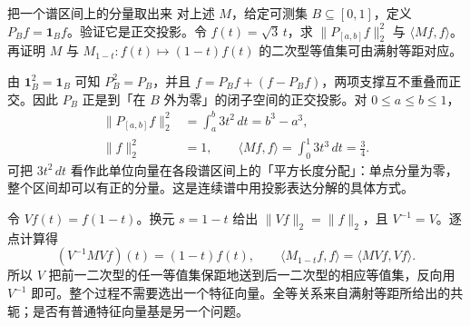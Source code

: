 \begin{example}{把一个谱区间上的分量取出来}
对上述 \(M\)，给定可测集 \(B\subseteq[0,1]\)，定义 \(P_B f=\mathbf1_B f\)。验证它是正交投影。令 \(f(t)=\sqrt3\,t\)，求 \(\|P_{[a,b]}f\|_2^2\) 与 \(\langle Mf,f\rangle\)。再证明 \(M\) 与 \(M_{1-t}:f(t)\mapsto(1-t)f(t)\) 的二次型等值集可由满射等距对应。
\end{example}
\begin{solution}
由 \(\mathbf1_B^2=\mathbf1_B\) 可知 \(P_B^2=P_B\)，并且 \(f=P_Bf+(f-P_Bf)\)，两项支撑互不重叠而正交。因此 \(P_B\) 正是到「在 \(B\) 外为零」的闭子空间的正交投影。对 \(0\leq a\leq b\leq1\)，
\begin{align*}
 \|P_{[a,b]}f\|_2^2&=\int_a^b 3t^2\,dt=b^3-a^3,\\
 \|f\|_2^2&=1,\qquad
 \langle Mf,f\rangle=\int_0^1 3t^3\,dt=\frac34.
\end{align*}
可把 \(3t^2\,dt\) 看作此单位向量在各段谱区间上的「平方长度分配」：单点分量为零，整个区间却可以有正的分量。这是连续谱中用投影表达分解的具体方式。

令 \(Vf(t)=f(1-t)\)。换元 \(s=1-t\) 给出 \(\|Vf\|_2=\|f\|_2\)，且 \(V^{-1}=V\)。逐点计算得
\[
 (V^{-1}MVf)(t)=(1-t)f(t),
 \qquad
 \langle M_{1-t}f,f\rangle=\langle MVf,Vf\rangle.
\]
所以 \(V\) 把前一二次型的任一等值集保距地送到后一二次型的相应等值集，反向用 \(V^{-1}\) 即可。整个过程不需要选出一个特征向量。全等关系来自满射等距所给出的共轭；是否有普通特征向量基是另一个问题。
\end{solution}

